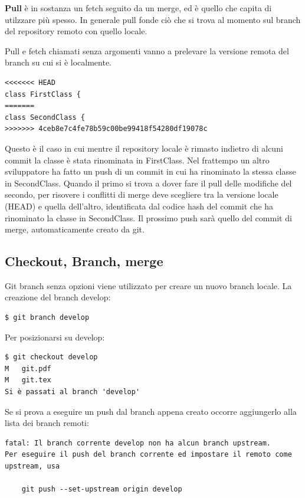 \documentclass{article} \usepackage[textwidth=18cm,textheight=18cm]{geometry}
\begin{document}
\textbf{Pull} è in sostanza un fetch seguito da un merge, ed è quello che capita di
utilzzare più spesso. In generale pull fonde ciò che si trova al momento sul branch del 
repository remoto con quello locale.

Pull e fetch chiamati senza argomenti vanno a prelevare la versione remota del
branch su cui si è localmente.

\begin{verbatim}
<<<<<<< HEAD
class FirstClass {
=======
class SecondClass {
>>>>>>> 4ceb8e7c4fe78b59c00be99418f54280df19078c
\end{verbatim}

Questo è il caso in cui mentre il repository locale è rimasto indietro di alcuni
commit la classe è stata rinominata in FirstClass. Nel frattempo un altro
sviluppatore ha fatto un push di un commit in cui ha rinominato la stessa classe in
SecondClass. Quando il primo si trova a dover fare il pull delle modifiche del
secondo, per risovere i conflitti di merge deve scegliere tra la versione locale
(HEAD) e quella dell'altro,
identificata dal codice hash del commit che ha rinominato la classe in
SecondClass. Il prossimo push sarà quello del commit di merge, automaticamente
creato da git.

\subsection{Checkout, Branch, merge}

Git branch senza opzioni viene utilizzato per creare un nuovo branch locale. La
creazione del branch develop:

\begin{verbatim}
$ git branch develop
\end{verbatim}

Per posizionarsi su develop:

\begin{verbatim}
$ git checkout develop
M	git.pdf
M	git.tex
Si è passati al branch 'develop'
\end{verbatim}

Se si prova a eseguire un push dal branch appena creato occorre
aggiungerlo alla lista dei branch remoti:

\begin{verbatim}
fatal: Il branch corrente develop non ha alcun branch upstream.
Per eseguire il push del branch corrente ed impostare il remoto come upstream, usa

    git push --set-upstream origin develop
\end{verbatim}
\end{document}
